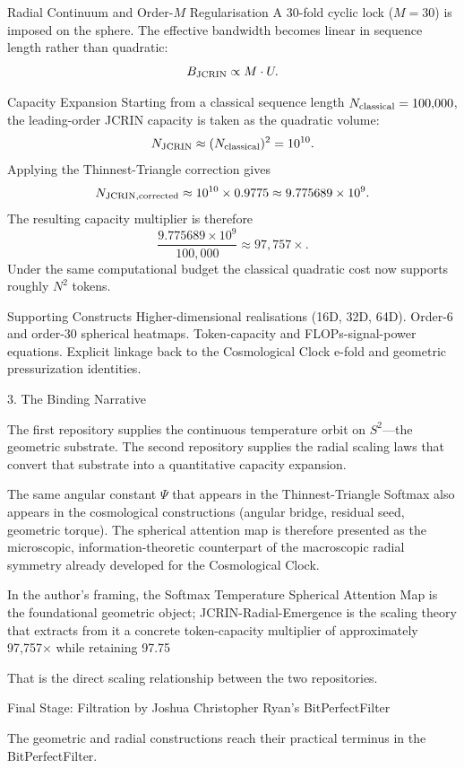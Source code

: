 Radial Continuum and Order-\(M\) Regularisation  
   A 30-fold cyclic lock (\(M=30\)) is imposed on the sphere. The effective bandwidth becomes linear in sequence length rather than quadratic:
   \[
   B_{\rm JCRIN}\propto M\cdot U.
   \]

Capacity Expansion  
   Starting from a classical sequence length \(N_{\rm classical}=100{,}000\), the leading-order JCRIN capacity is taken as the quadratic volume:
   \[
   N_{\rm JCRIN}\approx(N_{\rm classical})^2=10^{10}.
   \]
   Applying the Thinnest-Triangle correction gives
   \[
   N_{\rm JCRIN, corrected}\approx 10^{10}\times 0.9775\approx 9.775689\times 10^9.
   \]
   The resulting capacity multiplier is therefore
   \[
   \frac{9.775689\times 10^9}{100{,}000}\approx 97{,}757\times.
   \]
   Under the same computational budget the classical quadratic cost now supports roughly \(N^2\) tokens.

Supporting Constructs  
   Higher-dimensional realisations (16D, 32D, 64D).  
   Order-6 and order-30 spherical heatmaps.  
   Token-capacity and FLOPs-signal-power equations.  
   Explicit linkage back to the Cosmological Clock e-fold and geometric pressurization identities.

3. The Binding Narrative

The first repository supplies the continuous temperature orbit on \(S^2\)—the geometric substrate.  
The second repository supplies the radial scaling laws that convert that substrate into a quantitative capacity expansion.  

The same angular constant \(\Psi\) that appears in the Thinnest-Triangle Softmax also appears in the cosmological constructions (angular bridge, residual seed, geometric torque). The spherical attention map is therefore presented as the microscopic, information-theoretic counterpart of the macroscopic radial symmetry already developed for the Cosmological Clock.  

In the author’s framing, the Softmax Temperature Spherical Attention Map is the foundational geometric object; JCRIN-Radial-Emergence is the scaling theory that extracts from it a concrete token-capacity multiplier of approximately 97,757× while retaining 97.75 %

That is the direct scaling relationship between the two repositories.

Final Stage: Filtration by Joshua Christopher Ryan’s BitPerfectFilter

The geometric and radial constructions reach their practical terminus in the BitPerfectFilter.

